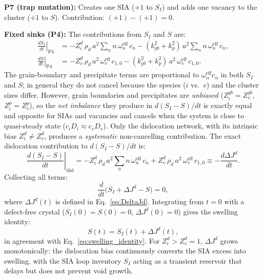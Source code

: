\textbf{P7 (trap mutation):}
Creates one SIA ($+1$ to $S_I$) and adds one vacancy to the cluster
($+1$ to $S$). Contribution: $(+1)-(+1) = 0$. \checkmark

\textbf{Fixed sinks (P4):}
The contributions from $S_I$ and $S$ are:
\begin{align}
    \left.\frac{dS_I}{dt}\right|_{\mathrm{P4}}
    &= -Z_i^d\,\rho_d\,a^2\sum_n n\,\omega_n^{\mathrm{eff}}\,c_n
       - (k_{gb}^2 + k_p^2)\,a^2\sum_n n\,\omega_n^{\mathrm{eff}}\,c_n,
    \label{eq:P4_SI_final}\\[4pt]
    \left.\frac{dS}{dt}\right|_{\mathrm{P4}}
    &= -Z_v^d\,\rho_d\,a^2\,\omega_v^{\mathrm{eff}}\,c_{1,0}
       - (k_{gb}^2 + k_p^2)\,a^2\,\omega_v^{\mathrm{eff}}\,c_{1,0}.
    \label{eq:P4_SV_final}
\end{align}
The grain-boundary and precipitate terms are proportional to
$\omega_\alpha^{\mathrm{eff}} c_\alpha$ in both $S_I$ and $S$; in general
they do not cancel because the species ($i$ vs.\ $v$) and the cluster sizes
differ. However, grain boundaries and precipitates are \emph{unbiased}
($Z_i^{gb} = Z_v^{gb}$, $Z_i^p = Z_v^p$), so the \emph{net imbalance}
they produce in $d(S_I - S)/dt$ is exactly equal and opposite for SIAs and
vacancies and cancels when the system is close to quasi-steady state
($c_i D_i \approx c_v D_v$). Only the dislocation network, with its
intrinsic bias $Z_i^d \neq Z_v^d$, produces a \emph{systematic}
non-cancelling contribution. The exact dislocation contribution to
$d(S_I - S)/dt$ is:
\begin{equation}\label{eq:P4_Q}
    \left.\frac{d(S_I - S)}{dt}\right|_{\mathrm{disl}}
    = -Z_i^d\,\rho_d\,a^2\sum_n n\,\omega_n^{\mathrm{eff}}\,c_n
    + Z_v^d\,\rho_d\,a^2\,\omega_v^{\mathrm{eff}}\,c_{1,0}
    \equiv -\frac{d\Delta J^d}{dt}.
\end{equation}
Collecting all terms:
\begin{equation}\label{eq:dQdt_exact}
\boxed{
    \frac{d}{dt}\bigl(S_I + \Delta J^d - S\bigr) = 0,
}
\end{equation}
where $\Delta J^d(t)$ is defined in Eq.~\eqref{eq:DeltaJd}. Integrating
from $t=0$ with a defect-free crystal ($S_I(0) = S(0) = 0$,
$\Delta J^d(0) = 0$) gives the swelling identity:
\begin{equation}\label{eq:swelling_id_app}
    S(t) = S_I(t) + \Delta J^d(t),
\end{equation}
in agreement with Eq.~\eqref{eq:swelling_identity}. For $Z_i^d > Z_v^d = 1$,
$\Delta J^d$ grows monotonically: the dislocation bias continuously converts
the SIA excess into swelling, with the SIA loop inventory $S_I$ acting as a
transient reservoir that delays but does not prevent void growth.

